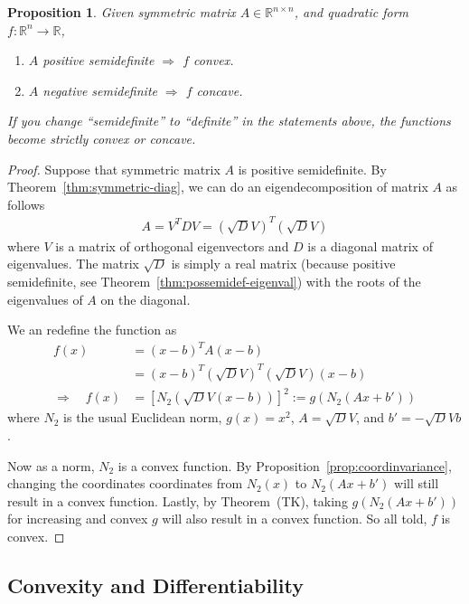 \documentclass[12pt]{article}
\numberwithin{equation}{section} %
\theoremstyle{plain}
\newtheorem{prop}[thm]{Proposition}
\theoremstyle{definition}
\theoremstyle{remark}
\newcommand{\R}{\mathbb{R}}
\newcommand{\Rn}{\mathbb{R}^n}
\newcommand{\Rnn}{\mathbb{R}^{n\times n}}
\begin{document}
\begin{prop}
Given symmetric matrix $A\in\Rnn$, and quadratic form
$f:\Rn\rightarrow\R$,
\begin{enumerate}
  \item $A$ positive semidefinite $\Rightarrow$ $f$ convex.
  \item $A$ negative semidefinite $\Rightarrow$ $f$ concave.
\end{enumerate}
If you change ``semidefinite'' to ``definite'' in the statements above,
the functions become \emph{strictly} convex or concave.
\end{prop}
\begin{proof}
Suppose that symmetric matrix $A$ is positive semidefinite. By
Theorem~\ref{thm:symmetric-diag}, we can do an eigendecomposition of
matrix $A$ as follows
\begin{align*}
  A = V^T D V = \left(\sqrt{D}V\right)^T \left(\sqrt{D} V\right)
\end{align*}
where $V$ is a matrix of orthogonal eigenvectors and $D$ is a diagonal
matrix of eigenvalues. The matrix $\sqrt{D}$ is simply a real matrix
(because positive semidefinite, see
Theorem~\ref{thm:possemidef-eigenval}) with the roots of the
eigenvalues of $A$ on the diagonal.

We an redefine the function as
\begin{align*}
  f(x) &= (x-b)^T A (x-b) \\
  &= (x-b)^T \left(\sqrt{D}V\right)^T \left(\sqrt{D} V\right)(x-b) \\
  \Rightarrow\quad
  f(x)
  &= \left[N_2\left( \sqrt{D} V(x-b) \right)\right]^2
  := g(N_2(Ax+b'))
\end{align*}
where $N_2$ is the usual Euclidean norm, $g(x)=x^2$, $A=\sqrt{D}V$, and
$b'=-\sqrt{D}Vb$.

Now as a norm, $N_2$ is a convex function. By
Proposition~\ref{prop:coordinvariance}, changing the coordinates
coordinates from $N_2(x)$ to $N_2(Ax+b')$ will still result in a convex
function. Lastly, by Theorem~(TK), taking $g(N_2(Ax+b'))$ for increasing
and convex $g$ will also result in a convex function. So all told, $f$
is convex.
\end{proof}


\subsection{Convexity and Differentiability}
\end{document}
